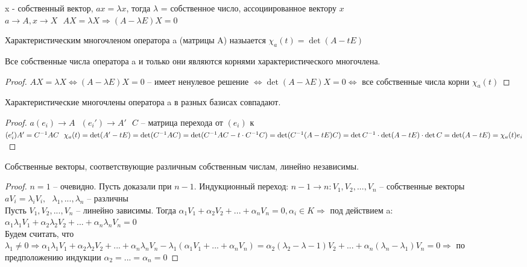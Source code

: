 \begin{Def} 
	x - собственный вектор, $ax = \lambda x$, тогда $\lambda$ = собственное число, ассоциированное вектору $x$\\
	$a \to A, x \to X \ \ \ AX = \lambda X \Rightarrow (A - \lambda E)X = 0$
\end{Def} 

\begin{Def} 
	Характеристическим многочленом оператора a (матрицы A) назыается $\chi_a(t) = \det (A-tE)$
\end{Def} 

\begin{Thm}
	Все собственные числа оператора a и только они являются корнями характеристического многочлена. 
\end{Thm}

\begin{proof}
	$AX = \lambda X \Leftrightarrow (A - \lambda E)X = 0$ -- имеет ненулевое решение $\Leftrightarrow 
	\det (A- \lambda E)X = 0 \Leftrightarrow$ все собственные числа корни $\chi_a(t)$
\end{proof}

\begin{Lm}
	Характеристические многочлены оператора a в разных базисах совпадают. 
\end{Lm}

\begin{proof}
	$a(e_i) \to A \ \ \ (e_i') \to A' \ \ \ C $ -- матрица перехода от $(e_i)$ к $(e_i')\\
	A' = C^{-1}AC \ \ \chi_a(t) = \det (A' - tE) = \det(C^{-1}AC) = \det (C^{-1}AC - t \cdot C^{-1}C) =
	\det(C^{-1} (A-tE)C) = \det C^{-1} \cdot \det(A - tE) \cdot \det C = \det(A-tE) = \chi_a(t)e_i$
\end{proof}

\begin{Thm}
	Собственные векторы, соответствующие различным собственным числам, линейно независимы. 
\end{Thm} 

\begin{proof}
	$n = 1$ -- очевидно.
	Пусть доказали при $n-1$. Индукционный переход: $n-1 \to n: V_1, V_2, ..., V_n$ -- собственные векторы\\
	$aV_i = \lambda_i V_i, \ \ \ \lambda_1, ..., \lambda_n$ -- различны\\
	Пусть $V_1, V_2, ..., V_n$ -- линейно зависимы. Тогда $\alpha_1 V_1 + \alpha_2 V_2 + ... + \alpha_n V_n = 0, \alpha_i \in K \Rightarrow$
	под действием a: $\alpha_1 \lambda_1 V_1 + \alpha_2 \lambda_2 V_2 + ... + \alpha_n \lambda_n V_n = 0$\\
	Будем считать, что $\lambda_1 \neq 0 \Rightarrow \alpha_1 \lambda_1 V_1 + \alpha_2 \lambda_2 V_2 + ... + \alpha_n \lambda_n V_n - \lambda_1(\alpha_1 V_1 + ... + \alpha_n V_n) =
	\alpha_2(\lambda_2 - \lambda-1)V_2 + ... + \alpha_n(\lambda_n - \lambda_1)V_n = 0 \Rightarrow$ по предположению индукции $\alpha_2 = ... = \alpha_n = 0$ 
\end{proof}

